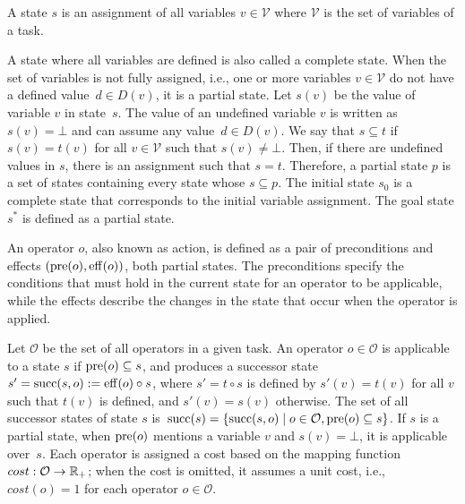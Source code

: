 \begin{definition}[State]\label{def:state}
    A state $s$ is an assignment of all variables $v \in \mathcal{V}$ where $\mathcal{V}$ is the set of variables of a task.
\end{definition}

A state where all variables are defined is also called a complete state. When the set of variables is not fully assigned, i.e., one or more variables $v \in \mathcal{V}$ do not have a defined value~$d \in D(v)$, it is a partial state. Let $s(v)$ be the value of variable $v$ in state~$s$. The value of an undefined variable $v$ is written as $s(v) = \bot$ and can assume any value~$d \in D(v)$. We say that $s \subseteq t$ if $s(v) = t(v)$ for all $v \in \mathcal{V}$ such that $s(v) \neq \bot$. Then, if there are undefined values in $s$, there is an assignment such that $s = t$. Therefore, a partial state $p$ is a set of states containing every state whose $s \subseteq p$. The initial state $s_0$ is a complete state that corresponds to the initial variable assignment. The goal state $s^*$ is defined as a partial state.

\begin{definition}[Operator]\label{def:operator}
    An operator $o$, also known as action, is defined as a pair of preconditions and effects $(\operatorname{pre}(o),\operatorname{eff}(o))$, both partial states. The preconditions specify the conditions that must hold in the current state for an operator to be applicable, while the effects describe the changes in the state that occur when the operator is applied.
\end{definition}

Let $\mathcal{O}$ be the set of all operators in a given task. An operator $o \in \mathcal{O}$ is applicable to a state $s$ if $\operatorname{pre}(o) \subseteq s$, and produces a successor state $s' = \operatorname{succ}(s,o) := \operatorname{eff}(o) \circ s$, where $s' = t \circ s$ is defined by $s'(v) = t(v)$ for all $v$ such that $t(v)$ is defined, and $s'(v) = s(v)$ otherwise. The set of all successor states of state $s$ is~$\operatorname{succ}(s)=\{\operatorname{succ}(s,o)\mid o\in \mathcal{O}, \operatorname{pre}(o) \subseteq s\}$. If $s$ is a partial state, when $\operatorname{pre}(o)$ mentions a variable $v$ and $s(v) = \bot$, it is applicable over~$s$. Each operator is assigned a cost based on the mapping function~$cost:\mathcal{O}\rightarrow\mathbb{R}_{+}$; when the cost is omitted, it assumes a unit cost, i.e., $cost(o) = 1$ for each operator $o \in \mathcal{O}$.


